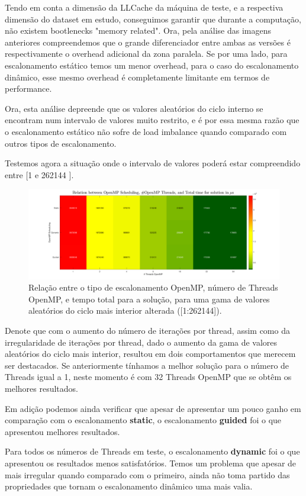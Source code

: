 \documentclass[a4paper]{article}
\begin{document}
Tendo em conta a dimensão da LLCache da máquina de teste, e a respectiva dimensão do dataset em estudo, conseguimos garantir que durante a computação, não existem bootlenecks "memory related". Ora, pela análise das imagens anteriores compreendemos que o grande diferenciador entre ambas as versões é respectivamente o overhead adicional da zona paralela. Se por uma lado, para escalonamento estático temos um menor overhead, para o caso do escalonamento dinâmico, esse mesmo overhead é completamente limitante em termos de performance. \par 
Ora, esta análise depreende que os valores aleatórios do ciclo interno se encontram num intervalo de valores muito restrito, e é por essa mesma razão que o escalonamento estático não sofre de load imbalance quando comparado com outros tipos de escalonamento. \par Testemos agora a situação onde o intervalo de valores poderá estar compreendido entre [1 e  262144 ].

\begin{figure}[H]
\centering
\includegraphics[width=1\columnwidth]{PNG/heatmap_scheduling_openmp_large.png}
\caption{ Relação entre o tipo de escalonamento OpenMP, número de Threads OpenMP, e tempo total para a solução, para uma gama de valores aleatórios do ciclo mais interior alterada ([1:262144]). }
\label{fig:heatmap_scheduling_openmp}
\end{figure}


Denote que com o aumento do número de iterações por thread, assim como da irregularidade de iterações por thread, dado o aumento da  gama de valores aleatórios do ciclo mais interior, resultou em dois comportamentos que merecem ser destacados. Se anteriormente tínhamos a melhor solução para o número de Threads igual a 1, neste momento é com 32 Threads OpenMP que se obtêm os melhores resultados. \par
Em adição podemos ainda verificar que apesar de apresentar um pouco ganho em comparação com o escalonamento \textbf{static}, o escalonamento \textbf{guided} foi o que apresentou melhores resultados. \par 
Para todos os números de Threads em teste, o escalonamento \textbf{dynamic} foi o que apresentou os resultados menos satisfatórios. Temos um problema que apesar de mais irregular quando comparado com o primeiro, ainda não toma partido das propriedades que tornam o escalonamento dinâmico uma mais valia.\par 
\end{document}
